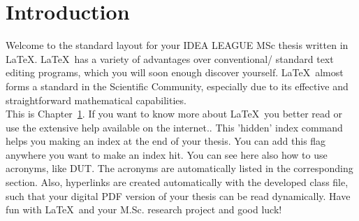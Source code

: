 \chapter{Introduction} \label{chap::intro}

    Welcome to the standard layout for your IDEA LEAGUE MSc thesis written in \LaTeX. \LaTeX\  has a variety of advantages over conventional/ standard text editing programs, which you will soon enough discover yourself. \LaTeX\  almost forms a standard in the Scientific Community, especially due to its effective and straightforward mathematical capabilities.\\
    This is Chapter\ \ref{chap::intro}. If you want to know more about \LaTeX\ you better read
    \cite{texbook} or use the extensive help available on the internet.. This 'hidden' index command helps you making an index at the end of your thesis. You can add this flag anywhere you want to make an index hit. You can see here also how to use acronyms, like \ac{DUT}. The acronyms are automatically listed in the corresponding section. Also, hyperlinks are created automatically with the developed class file, such that your digital PDF version of your thesis can be read dynamically.
 Have fun with \LaTeX\ and your M.Sc. research project and good luck!